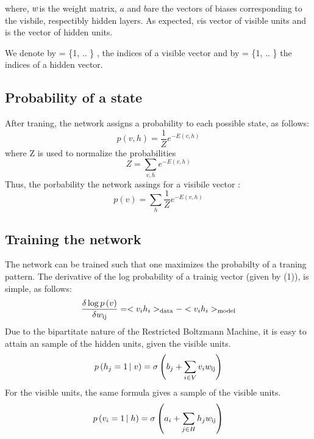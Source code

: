 where, $w_{{{}}}$is the weight matrix, $a$ and $b$are the
vectors of biases corresponding to the visbile, respectibly hidden layers. As
expected, $v$is vector of visible units and  is the vector of
hidden units.

We denote by  = \{1, ..  \} , the
indices of a visible vector and by  = \{1, .. 
\} the indices of a hidden vector.



\subsection{Probability of a state}

After traning, the network assigns a probability to each possible state, as
follows:
\[ p \left( v, h \right) = \frac{1}{Z} e^{- E \left( v, h \right)} \]
where Z is used to normalize the probabilities
\[ Z = \sum_{v, h} e^{- E \left( v, h \right)} \]
Thus, the porbability the network assings for a visibile vector :
\begin{equation}
  p \left( v \right) = \sum_h \frac{1}{Z} e^{- E \left( v, h \right)}
\end{equation}

\subsection{Training the network}

The network can be trained such that one maximizes the probabilty of a traning
pattern. The derivative of the log probability of a trainig vector (given by
(1)), is simple, as follows:
\[ \frac{\delta \log p \left( v \right)}{\delta w_{\operatorname{ij}}} = < v_i h_i
   >_{\operatorname{data}} - < v_i h_i >_{\operatorname{model}} \]
Due to the bipartitate nature of the Restricted Boltzmann Machine, it is easy
to attain an  sample of the hidden units, given the
visible units.
\begin{equation}
  p \left( h_j = 1 \left|  \right. v \right) = \sigma \left( b_j + \sum_{i \in
  V} v_i w_{\operatorname{ij}} \right)
\end{equation}
For the visible units, the same formula gives a  sample of
the visible units.
\begin{equation}
  p \left( v_i = 1 \left|  \right. h \right) = \sigma \left( a_i + \sum_{j \in
  H} h_j w_{\operatorname{ij}} \right)
\end{equation}


